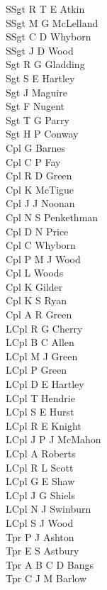 \begin{multicols}{3}
  \small
  \noindent
  SSgt R T E Atkin \\
  SSgt M G McLelland \\
  SSgt C D Whyborn \\
  SSgt J D Wood \\
  Sgt R G Gladding \\
  Sgt S E Hartley \\
  Sgt J Maguire \\
  Sgt F Nugent \\
  Sgt T G Parry \\
  Sgt H P Conway \\
  Cpl G Barnes \\
  Cpl C P Fay \\
  Cpl R D Green \\
  Cpl K McTigue \\
  Cpl J J Noonan \\
  Cpl N S Penkethman \\
  Cpl D N Price \\
  Cpl C Whyborn \\
  Cpl P M J Wood \\
  Cpl L Woods \\
  Cpl K Gilder \\
  Cpl K S Ryan \\
  Cpl A R Green \\
  LCpl R G Cherry \\
  LCpl B C Allen \\
  LCpl M J Green \\
  LCpl P Green \\
  LCpl D E Hartley \\
  LCpl T Hendrie \\
  LCpl S E Hurst \\
  LCpl R E Knight \\
  LCpl J P J McMahon \\
  LCpl A Roberts \\
  LCpl R L Scott \\
  LCpl G E Shaw \\
  LCpl J G Shiels \\
  LCpl N J Swinburn \\
  LCpl S J Wood \\
  Tpr P J Ashton \\
  Tpr E S Astbury \\
  Tpr A B C D Bangs \\
  Tpr C J M Barlow \\

\end{multicols}
